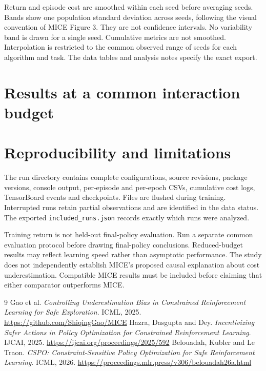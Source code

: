 \documentclass[11pt,a4paper]{article}
\begin{document}
Return and episode cost are smoothed within each seed before averaging seeds.
Bands show one population standard deviation across seeds, following the visual
convention of MICE Figure 3. They are not confidence intervals. No variability
band is drawn for a single seed. Cumulative metrics are not smoothed.
Interpolation is restricted to the common observed range of seeds for each
algorithm and task. The data tables and analysis notes specify the exact export.

\section{Results at a common interaction budget}


\clearpage

\section{Reproducibility and limitations}
The run directory contains complete configurations, source revisions, package
versions, console output, per-episode and per-epoch CSVs, cumulative cost logs,
TensorBoard events and checkpoints. Files are flushed during training.
Interrupted runs retain partial observations and are identified in the data status.
The exported \texttt{included\_runs.json} records exactly which runs were analyzed.

Training return is not held-out final-policy evaluation. Run a separate common
evaluation protocol before drawing final-policy conclusions. Reduced-budget
results may reflect learning speed rather than asymptotic performance.
The study does not independently establish MICE's proposed causal explanation
about cost underestimation. Compatible MICE results must be included before
claiming that either comparator outperforms MICE.

\begin{thebibliography}{9}
 Gao et al. \emph{Controlling Underestimation Bias in Constrained
Reinforcement Learning for Safe Exploration}. ICML, 2025.
\url{https://github.com/ShiqingGao/MICE}
 Hazra, Dasgupta and Dey. \emph{Incentivizing Safer Actions in Policy
Optimization for Constrained Reinforcement Learning}. IJCAI, 2025.
\url{https://ijcai.org/proceedings/2025/592}
 Belouadah, Kubler and Le Traon. \emph{CSPO: Constraint-Sensitive
Policy Optimization for Safe Reinforcement Learning}. ICML, 2026.
\url{https://proceedings.mlr.press/v306/belouadah26a.html}
\end{thebibliography}
\end{document}
